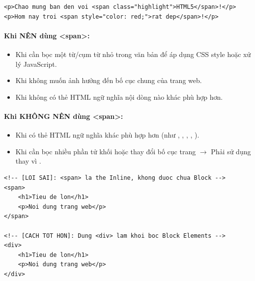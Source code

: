 \begin{codeWindow}
\begin{lstlisting}[language=HTML5]
<p>Chao mung ban den voi <span class="highlight">HTML5</span>!</p>
<p>Hom nay troi <span style="color: red;">rat dep</span>!</p>
\end{lstlisting}
\end{codeWindow}

\paragraph{Khi NÊN dùng <span>:}
\begin{itemize}[leftmargin=1.8em, itemsep=3pt, parsep=0pt]
    \item Khi cần bọc một từ/cụm từ nhỏ trong văn bản để áp dụng CSS style hoặc xử lý JavaScript.
    \item Khi không muốn ảnh hưởng đến bố cục chung của trang web.
    \item Khi không có thẻ HTML ngữ nghĩa nội dòng nào khác phù hợp hơn.
\end{itemize}

\paragraph{Khi KHÔNG NÊN dùng <span>:}
\begin{itemize}[leftmargin=1.8em, itemsep=3pt, parsep=0pt]
    \item Khi có thẻ HTML ngữ nghĩa khác phù hợp hơn (như , , , , ).
    \item Khi cần bọc nhiều phần tử khối hoặc thay đổi bố cục trang $\rightarrow$ Phải sử dụng  thay vì .
\end{itemize}

\begin{codeWindow}
\begin{lstlisting}[language=HTML5]
<!-- [LOI SAI]: <span> la the Inline, khong duoc chua Block -->
<span>
    <h1>Tieu de lon</h1>
    <p>Noi dung trang web</p>
</span>

<!-- [CACH TOT HON]: Dung <div> lam khoi boc Block Elements -->
<div>
    <h1>Tieu de lon</h1>
    <p>Noi dung trang web</p>
</div>
\end{lstlisting}
\end{codeWindow}

